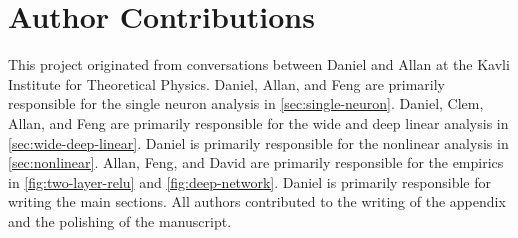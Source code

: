 \documentclass{article}
\theoremstyle{plain}
\theoremstyle{definition}
\theoremstyle{remark}
\begin{document}
\section*{Author Contributions}
This project originated from conversations between Daniel and Allan at the Kavli Institute for Theoretical Physics.
%
Daniel, Allan, and Feng are primarily responsible for the single neuron analysis in \cref{sec:single-neuron}.
%
Daniel, Clem, Allan, and Feng are primarily responsible for the wide and deep linear analysis in \cref{sec:wide-deep-linear}.
%
Daniel is primarily responsible for the nonlinear analysis in \cref{sec:nonlinear}.
%
Allan, Feng, and David are primarily responsible for the empirics in \cref{fig:two-layer-relu} and \cref{fig:deep-network}.
%
Daniel is primarily responsible for writing the main sections.
%
All authors contributed to the writing of the appendix and the polishing of the manuscript.


\appendix






\end{document}
